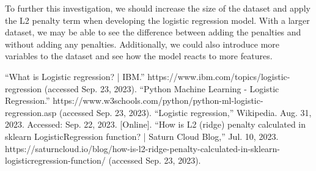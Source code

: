 \documentclass[journal]{IEEEtran}
\begin{document}
To further this investigation, we should increase the size of the dataset and apply the L2 penalty term when developing the logistic regression model. With a larger dataset, we may be able to see the difference between adding the penalties and without adding any penalties. Additionally, we could also introduce more variables to the dataset and see how the model reacts to more features. 

\begin{thebibliography}{00}
“What is Logistic regression? | IBM.” https://www.ibm.com/topics/logistic-regression (accessed Sep. 23, 2023).
“Python Machine Learning - Logistic Regression.” https://www.w3schools.com/python/python-ml-logistic-regression.asp (accessed Sep. 23, 2023).
“Logistic regression,” Wikipedia. Aug. 31, 2023. Accessed: Sep. 22, 2023. [Online]. 
“How is L2 (ridge) penalty calculated in sklearn LogisticRegression function? | Saturn Cloud Blog,” Jul. 10, 2023. https://saturncloud.io/blog/how-is-l2-ridge-penalty-calculated-in-sklearn-logisticregression-function/ (accessed Sep. 23, 2023).

\end{thebibliography}
\end{document}

